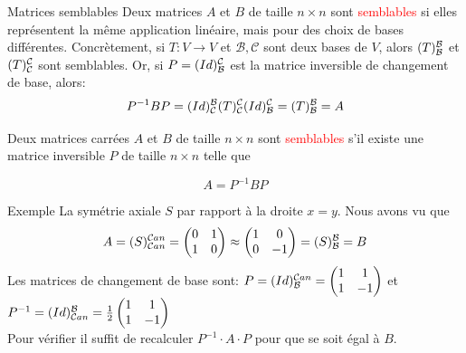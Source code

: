\begin{parag}{Matrices semblables}
    Deux matrices $A$ et $B$ de taille $n \times n$ sont \textcolor{red}{semblables} si elles représentent la même application linéaire, mais pour des choix de bases différentes. Concrètement, si $T : V \to V$ et $\mathcal{B}, \mathcal{C}$ sont deux bases de $V$, alors $(T)_{\mathcal{B}}^{\mathcal{B}}$ et $(T)_{\mathcal{C}}^{\mathcal{C}}$ sont semblables. Or, si $P = (Id)_{\mathcal{B}}^{\mathcal{C}}$ est la matrice inversible de changement de base, alors:
    \[P^{-1}BP = (Id)_{\mathcal{C}}^{\mathcal{B}}(T)_{\mathcal{C}}^{\mathcal{C}}(Id)_{\mathcal{B}}^{\mathcal{C}} = (T)_{\mathcal{B}}^{\mathcal{B}} = A\]

    \begin{definition}
        Deux matrices carrées $A$ et $B$ de taille $n\times n$ sont \textcolor{red}{semblables} s'il existe une matrice inversible $P$ de taille $n \times n$ telle que 
        \begin{formule}
            \[A = P^{-1}BP\]
        \end{formule}
    \end{definition}

    \begin{subparag}{Exemple}
        La symétrie axiale $S$ par rapport à la droite $x = y$. Nous avons vu que
        \[A = (S)_{\mathcal{C} an}^{\mathcal{C} an} = \begin{pmatrix}
            0 & 1 \\
            1 & 0
        \end{pmatrix} \approx \begin{pmatrix}
            1 & 0 \\ 0 & -1
        \end{pmatrix} = (S)_{\mathcal{B}}^{\mathcal{B}} = B\]
        Les matrices de changement de base sont:
        $P = (Id)_{\mathcal{B}}^{\mathcal{C} an} = \begin{pmatrix}
            1 & 1 \\ 1 & -1
        \end{pmatrix}$ et $P^{-1} = (Id)_{\mathcal{C} an}^{\mathcal{B}} = \frac{1}{2}\begin{pmatrix}
            1 & 1 \\ 1 & -1
        \end{pmatrix}$
        \\
        Pour vérifier il suffit de recalculer $P^{-1}\cdot A \cdot P$ pour que se soit égal à $B$.
    \end{subparag}
\end{parag}

